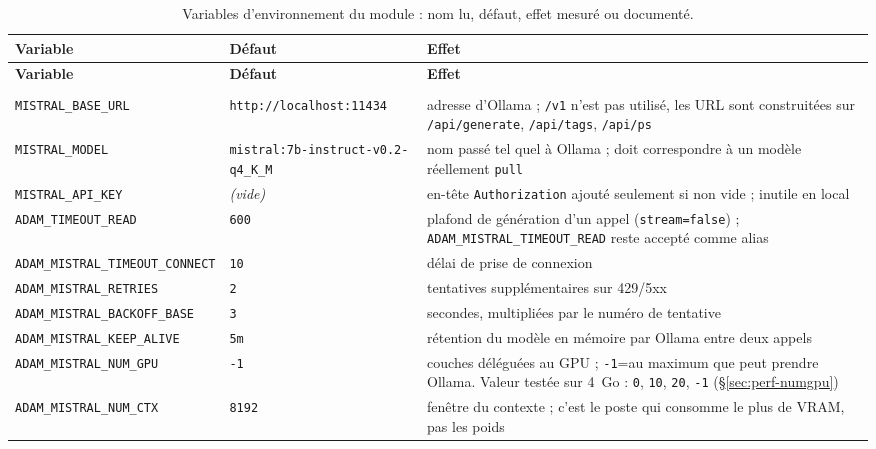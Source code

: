 \begin{small}
\setlength{\tabcolsep}{5pt}
\begin{longtable}{@{}>{\cellflush}p{4.5cm}
                  >{\cellflush}p{3.2cm}
                  >{\cellflush}p{6.7cm}@{}}
\caption{Variables d'environnement du module : nom lu, défaut, effet mesuré ou
documenté.}\label{tab:env}\\
\toprule
\textbf{Variable} & \textbf{Défaut} & \textbf{Effet} \\
\midrule
\endfirsthead
\toprule
\textbf{Variable} & \textbf{Défaut} & \textbf{Effet} \\
\midrule
\endhead
\bottomrule
\endlastfoot
\multicolumn{3}{@{}l}{\textbf{Modèle et transport}}\\
\texttt{MISTRAL\_BASE\_URL} & \texttt{http://\allowbreak localhost:11434} & adresse d'Ollama ; \texttt{/v1} n'est pas utilisé, les URL sont construitées sur \texttt{/api/generate}, \texttt{/api/tags}, \texttt{/api/ps} \\
\texttt{MISTRAL\_MODEL} & \texttt{mistral:7b-\brk{}instruct-\brk{}v0.2-\brk{}q4\_K\_M} & nom passé tel quel à Ollama ; doit correspondre à un modèle réellement \texttt{pull} \\
\texttt{MISTRAL\_API\_KEY} & \emph{(vide)} & en-tête \texttt{Authorization} ajouté seulement si non vide ; inutile en local \\
\texttt{ADAM\_TIMEOUT\_READ} & \texttt{600} & plafond de génération d'un appel (\texttt{stream=false}) ; \texttt{ADAM\_MISTRAL\_TIMEOUT\_READ} reste accepté comme alias \\
\texttt{ADAM\_MISTRAL\_TIMEOUT\_CONNECT} & \texttt{10} & délai de prise de connexion \\
\texttt{ADAM\_MISTRAL\_RETRIES} & \texttt{2} & tentatives supplémentaires sur 429/5xx \\
\texttt{ADAM\_MISTRAL\_BACKOFF\_BASE} & \texttt{3} & secondes, multipliées par le numéro de tentative \\
\texttt{ADAM\_MISTRAL\_KEEP\_ALIVE} & \texttt{5m} & rétention du modèle en mémoire par Ollama entre deux appels \\
\texttt{ADAM\_MISTRAL\_NUM\_GPU} & \texttt{-1} & couches déléguées au GPU ; \texttt{-1}=au maximum que peut prendre Ollama. Valeur testée sur 4~Go : \texttt{0}, \texttt{10}, \texttt{20}, \texttt{-1} (§\ref{sec:perf-numgpu}) \\
\texttt{ADAM\_MISTRAL\_NUM\_CTX} & \texttt{8192} & fenêtre du contexte ; c'est le poste qui consomme le plus de VRAM, pas les poids \\

\end{longtable}
\end{small}
